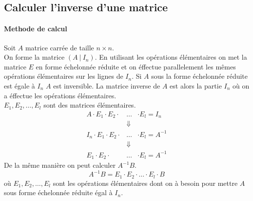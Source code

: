 %
\subsection{Calculer l'inverse d'une matrice}
%
\paragraph{Methode de calcul} Soit $A$ matrice carrée de taille $n\times n$. \\
On forme la matrice $(A ~ \vert ~ I_n)$. En utilisant les opérations élémentaires on met la matrice $E$ en forme échelonnée réduite et on éffectue parallelement les mêmes opérations élémentaires sur les lignes de $I_n$. Si $A$ sous la forme échelonnée réduite est égale à $I_n$ $A$ est inversible. La matrice inverse de $A$ est alors la partie $I_n$ où on a éffectue les opérations élémentaires. \\
$E_1, E_2, \ldots, E_l$ sont des matrices élémentaires.
\begin{eqnarray*}
  A \cdot E_1 \cdot E_2 \cdot &\ldots& \cdot E_l = I_n \\
  &\Downarrow& \\
  I_n \cdot E_1 \cdot E_2 \cdot &\ldots& \cdot E_l = A^{-1} \\
  &\Downarrow& \\
  E_1 \cdot E_2 \cdot &\ldots& \cdot E_l = A^{-1}
\end{eqnarray*}
De la même manière on peut calculer $A^{-1} B$.
$$A^{-1} B = E_1 \cdot E_2 \cdot \ldots \cdot E_l \cdot B$$
où $E_1, E_2, \ldots, E_l$ sont les opérations élémentaires dont on à besoin pour mettre $A$ sous forme échelonnée réduite égal à $I_n$.

